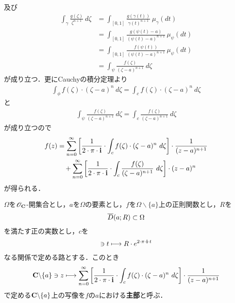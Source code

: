 \begin{sketch}
		及び
		\begin{align}
			\int_{\gamma} \frac{g(\zeta)}{\zeta^{n+1}}\ d\zeta
			&= \int_{[0,1]} \frac{g(\gamma(t))}{\gamma(t)^{n+1}}\ \mu_{\gamma}(dt) \\
			&= \int_{[0,1]} \frac{g(\psi(t)-a)}{(\psi(t)-a)^{n+1}}\ \mu_{\psi}(dt) \\
			&= \int_{[0,1]} \frac{f(\psi(t))}{(\psi(t)-a)^{n+1}}\ \mu_{\psi}(dt) \\
			&= \int_{\psi} \frac{f(\zeta)}{(\zeta-a)^{n+1}}\ d\zeta
		\end{align}
		が成り立つ．更にCauchyの積分定理より
		\begin{align}
			\int_{\phi} f(\zeta) \cdot (\zeta-a)^{n}\ d\zeta
			= \int_{c} f(\zeta) \cdot (\zeta-a)^{n}\ d\zeta
		\end{align}
		と
		\begin{align}
			\int_{\psi} \frac{f(\zeta)}{(\zeta-a)^{n+1}}\ d\zeta
			= \int_{c} \frac{f(\zeta)}{(\zeta-a)^{n+1}}\ d\zeta
		\end{align}
		が成り立つので
		\begin{align}
			f(z) &= \sum_{n=0}^{\infty} \left[ \frac{1}{2\cdot\pi\cdot\mathbf{i}} \cdot \int_{c} f(\zeta) \cdot (\zeta-a)^{n}\ d\zeta \right] \cdot \frac{1}{(z-a)^{n+1}} \\
			&\quad + \sum_{n=0}^{\infty} \left[ \frac{1}{2\cdot\pi\cdot\mathbf{i}} \cdot \int_{c} \frac{f(\zeta)}{(\zeta-a)^{n+1}}\ d\zeta \right] \cdot (z-a)^{n}
		\end{align}
		が得られる．
		\QED
	\end{sketch}
	
	\begin{screen}
		\begin{dfn}[主部]
			$\Omega$を$\mathscr{O}_{\mathbf{C}}$-開集合とし，$a$を$\Omega$の要素とし，$f$を$\Omega \backslash \{a\}$上の正則関数とし，$R$を
			\begin{align}
				\overline{D}(a;R) \subset \Omega
			\end{align}
			を満たす正の実数とし，$c$を
			\begin{align}
				[0,1] \ni t \longmapsto R \cdot e^{2 \cdot \pi \cdot \isym \cdot t}
			\end{align}
			なる関係で定める路とする．このとき
			\begin{align}
				\mathbf{C} \backslash \{a\} \ni z \longmapsto \sum_{n=0}^{\infty} \left[ \frac{1}{2\cdot\pi\cdot\mathbf{i}} \cdot \int_{c} f(\zeta) \cdot (\zeta-a)^{n}\ d\zeta \right] \cdot \frac{1}{(z-a)^{n+1}}
			\end{align}
			で定める$\mathbf{C} \backslash \{a\}$上の写像を$f$の$a$における{\bf 主部}と呼ぶ．
		\end{dfn}
	\end{screen}